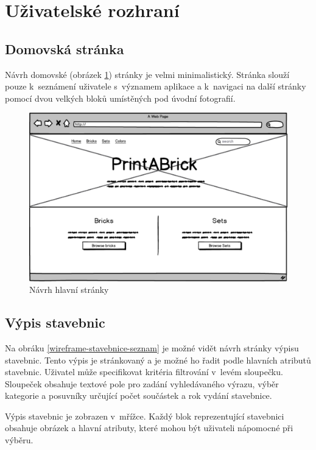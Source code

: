 \section{Uživatelské rozhraní}


\subsection{Domovská stránka}
Návrh domovské (obrázek \ref{wireframe-hlavni}) stránky je velmi minimalistický. Stránka slouží pouze k~seznámení uživatele s~významem aplikace a k~navigaci na další stránky pomocí dvou velkých bloků umístěných pod úvodní fotografií.

\begin{figure}[htbp]
    \centering
    \includegraphics[width=\textwidth,height=\textheight,keepaspectratio]{pdfs/wireframe_home.pdf}
    \caption{Návrh hlavní stránky}\label{wireframe-hlavni}
\end{figure}


\subsection{Výpis stavebnic}
Na obráku \ref{wireframe-stavebnice-seznam} je možné vidět návrh stránky výpisu stavebnic. Tento výpis je stránkovaný a je možné ho řadit podle hlavních atributů stavebnic. Uživatel může specifikovat kritéria filtrování v~levém sloupečku. Sloupeček obsahuje textové pole pro zadání vyhledávaného výrazu, výběr kategorie a posuvníky určující počet součástek a rok vydání stavebnice.

Výpis stavebnic je zobrazen v~mřížce. Každý blok reprezentující stavebnici obsahuje obrázek a hlavní atributy, které mohou být uživateli nápomocné při výběru.

